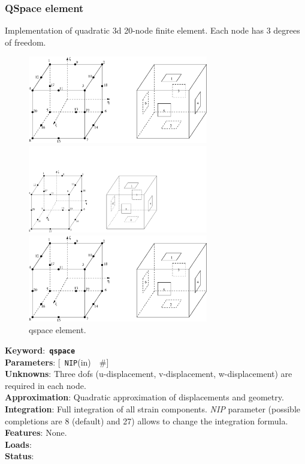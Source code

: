 \documentclass[a4paper]{article}
\newcommand{\descitem}[1]{{\noindent \bf #1}:}
\newcommand{\elemkeyword}[1]{\descitem{Keyword}~{\bf \texttt{#1}}}
\newcommand{\elemparam}[2]{{{\texttt{#1}\tiny (#2)}~~\#}}
\newcommand{\optelemparam}[2]{{[~\elemparam{#1}{#2}]}}
\newcommand{\param}[1]{{\em #1}}
\begin{document}
\subsubsection{QSpace element}
Implementation of quadratic 3d  20-node 
finite element. Each node has 3 degrees of freedom.
\begin{figure}[tb]
\begin{htmlonly}
  \centerline{\includegraphics[width=0.7\textwidth]{hexa_quad.eps}}
\end{htmlonly}
\ifpdf
 \centerline{\includegraphics[width=0.7\textwidth]{hexa_quad.pdf}}
\else
 \centerline{\includegraphics[width=0.7\textwidth]{hexa_quad.eps}}
\fi
\caption{qspace element.}
\end{figure}

\elemkeyword{qspace}\\
\descitem{Parameters} \optelemparam{NIP}{in}\\
\descitem{Unknowns}
Three dofs (u-displacement, v-displacement, w-displacement) are required in each node.\\
\descitem{Approximation} Quadratic approximation of displacements and
geometry.\\
\descitem{Integration}
Full integration of all strain components.
\param{NIP} parameter (possible completions are 8 (default) and 27)
allows to change the integration formula.\\
\descitem{Features} None.\\
\descitem{Loads} \\
\descitem{Status} 
\end{document}
